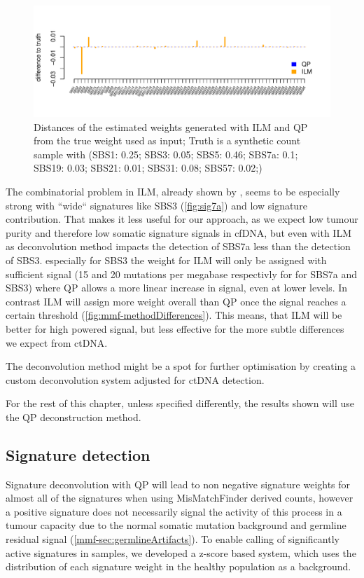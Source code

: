 \begin{figure}[!ht]
\centering
\includegraphics[width=.99\linewidth]{Figures/MisMatchFinder/lowInputSignalDeconv.pdf}
\caption[Distance of deconvolution methods from truth]{Distances of the estimated weights generated with ILM and QP from the true weight used as input; Truth is a synthetic count sample with (SBS1: 0.25; SBS3: 0.05; SBS5: 0.46; SBS7a: 0.1; SBS19: 0.03; SBS21: 0.01; SBS31: 0.08; SBS57: 0.02;)}\label{fig:mmf-ILMerror}
\end{figure}
 
The combinatorial problem in ILM, already shown by \textcite{Lynch2016}, seems to be especially strong with ``wide`` signatures like SBS3 (\autoref{fig:sig7a}) and low signature contribution. That makes it less useful for our approach, as we expect low tumour purity and therefore low somatic signature signals in cfDNA, but even with ILM as deconvolution method impacts the detection of SBS7a less than the detection of SBS3. especially for SBS3 the weight for ILM will only be assigned with sufficient signal (15 and 20 mutations per megabase respectivly for for SBS7a and SBS3) where QP allows a more linear increase in signal, even at lower levels. In contrast ILM will assign more weight overall than QP once the signal reaches a certain threshold (\autoref{fig:mmf-methodDifferences}). This means, that ILM will be better for high powered signal, but less effective for the more subtle differences we expect from ctDNA.

The deconvolution method might be a spot for further optimisation by creating a custom deconvolution system adjusted for ctDNA detection.

For the rest of this chapter, unless specified differently, the results shown will use the QP deconstruction method.



\subsection{Signature detection}
\label{mmf-sec:sigdetection}
Signature deconvolution with QP will lead to non negative signature weights for almost all of the signatures when using MisMatchFinder derived counts, however a positive signature does not necessarily signal the activity of this process in a tumour capacity due to the normal somatic mutation background and germline residual signal (\autoref{mmf-sec:germlineArtifacts}). To enable calling of significantly active signatures in samples, we developed a z-score based system, which uses the distribution of each signature weight in the healthy population as a background.

